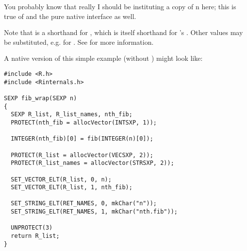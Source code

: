 You probably know that really I should be instituting a copy of n here; this is 
true of  and the pure native \C interface as well.

Note that  is a shorthand for , which is itself 
shorthand for \R's .  Other values may be substituted, e.g. 
 for .  See  for more 
information.  

A native version of this simple example (without \thispackage) 
might look like:

\begin{lstlisting}[language=fanC,title=Fibonacci Wrapper 2 - Native Interface]
#include <R.h>
#include <Rinternals.h>

SEXP fib_wrap(SEXP n)
{
  SEXP R_list, R_list_names, nth_fib;
  PROTECT(nth_fib = allocVector(INTSXP, 1));
  
  INTEGER(nth_fib)[0] = fib(INTEGER(n)[0]);
  
  PROTECT(R_list = allocVector(VECSXP, 2));
  PROTECT(R_list_names = allocVector(STRSXP, 2));
  
  SET_VECTOR_ELT(R_list, 0, n);
  SET_VECTOR_ELT(R_list, 1, nth_fib);
  
  SET_STRING_ELT(RET_NAMES, 0, mkChar("n"));
  SET_STRING_ELT(RET_NAMES, 1, mkChar("nth.fib")); 
  
  UNPROTECT(3)
  return R_list;
}
\end{lstlisting}



